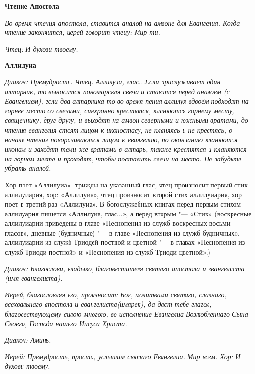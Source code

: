 \medskip
\bfseries Чтение Апостола \normalfont{}\nopagebreak

\itshape Во время чтения апостола, ставится аналой на амвоне для Евангелия. Когда чтение закончится, иерей говорит чтецу:\normalfont{} Мир ти.


\itshape  Чтец:\normalfont{} И духови твоему.


\medskip
\bfseries Аллилуиа \normalfont{}\nopagebreak


\itshape Диакон:\normalfont{} Премудрость.
\itshape Чтец:\normalfont{} Аллилуиа, глас...\itshape  Если прислуживает один алтарник, то выносится пономарская свеча и ставится перед аналоем (с Евангелием), если два алтарника то во время пения аллилуя вдвоём подходят на горнее место со свечами, синхронно крестятся, кланяются горнему месту, священнику, друг другу, и выходят на амвон северными и южными вратами, до чтения евангелия стоят лицом к иконостасу, не кланяясь и не крестясь, в начале чтения поворачиваются лицом к евангелию, по окончанию кланяются иконам и заходят теми же вратами в алтарь, также крестятся и кланяются на горнем месте и проходят, чтобы поставить свечи на место. Не забудьте убрать аналой.\normalfont{}


\medskip
Хор поет «Аллилуиа»- трижды на указанный глас, чтец произносит первый стих аллилуиария, хор: «Аллилуиа», чтец произносит второй стих аллилуиария, хор поет в третий раз «Аллилуиа». В богослужебных книгах перед первым стихом аллилуария пишется «Аллилуиа, глас...», а перед вторым "--- «Стих» (воскресные аллилуиарии приведены в главе «Песнопения из служб воскресных восьми гласов», дневные (будничные) "--- в главе «Песнопения из служб будничных», аллилуиарии из служб Триодей постной и цветной "--- в главах «Песнопения из служб Триоди постной» и «Песнопения из служб Триоди цветной».)


\itshape Диакон:\normalfont{} Благослови, владыко, благовестителя святаго апостола и евангелиста \itshape (имя евангелиста)\normalfont{}.


\itshape Иерей, благословляя его, произносит:\normalfont{} Бог, молитвами святаго, славнаго, всехвальнаго апостола и евангелиста\itshape  (имярек)\normalfont{}, да даст тебе глагол, благовествующему силою многою, во исполнение Евангелиа Возлюбленнаго Сына Своего, Господа нашего Иисуса Христа.


\itshape Диакон:\normalfont{} Аминь.


\itshape Иерей:\normalfont{} Премудрость, прости, услышим святаго Евангелиа. Мир всем.
\itshape Хор:\normalfont{} И духови твоему.


